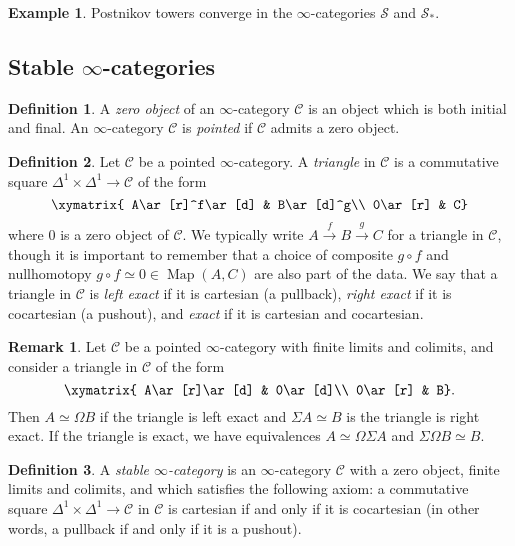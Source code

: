 \documentclass{article}
\theoremstyle{definition}
\newtheorem{definition}{Definition}[subsection]
\newtheorem{example}{Example}[subsection]
\newtheorem{remark}{Remark}[subsection]
\newcommand{\C}{\mathcal{C}}
\renewcommand{\S}{\mathcal{S}}
\renewcommand{\i}{\infty}
\DeclareMathOperator{\Map}{Map}
\begin{document}
\begin{example}
Postnikov towers converge in the  $\infty$-categories $\S$ and $\S_*$.
\end{example}




\subsection{Stable $\infty$-categories}


\begin{definition}
A {\em zero object} of an $\infty$-category $\C$ is an object which is both initial and final.
An $\infty$-category $\C$ is {\em pointed}\index{pointed $\i$-category} if $\C$ admits a zero object.
\end{definition} 
\begin{definition}
Let $\C$ be a pointed $\i$-category.
A {\em triangle} in $\C$ is a commutative square $\Delta^1\times\Delta^1\to\C$ of the form
\[
\xymatrix{
A\ar[r]^f\ar[d] & B\ar[d]^g\\
0\ar[r] & C}
\]
where $0$ is a zero object of $\C$.
We typically write $A\overset{f}{\to}B\overset{g}{\to}C$ for a triangle in $\C$, though it is important to remember that a choice of composite $g\circ f$ and nullhomotopy $g\circ f\simeq 0\in\Map(A,C)$ are also part of the data.
We say that a triangle in $\C$ is {\em left exact} if it is cartesian (a pullback), {\em right exact} if it is cocartesian (a pushout), and {\em exact} if it is cartesian and cocartesian.
\end{definition}
\begin{remark}
Let $\C$ be a pointed $\i$-category with finite limits and colimits, and consider a triangle in $\C$ of the form
\[
\xymatrix{
A\ar[r]\ar[d] & 0\ar[d]\\
0\ar[r] & B}.
\]
Then $A\simeq\Omega B$ if the triangle is left exact and $\Sigma A\simeq B$ is the triangle is right exact.
If the triangle is exact, we have equivalences $A\simeq\Omega\Sigma A$ and $\Sigma\Omega B\simeq B$.
\end{remark}
\begin{definition}
A {\em stable $\infty$-category} is an $\infty$-category $\C$ with a zero object, finite limits and colimits, and which satisfies the following axiom: a commutative square $\Delta^1\times\Delta^1\to\C$ in $\C$ is cartesian if and only if it is cocartesian (in other words, a pullback if and only if it is a pushout).
\end{definition}
\end{document}

